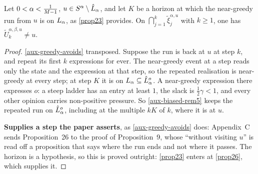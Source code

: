 \begin{lemma}
  \label{aux-near-greedy-avoids}
  \leanok
  Let $0 < \alpha < \tfrac{1}{M-1}$, $u \in S^\alpha \setminus \hat{L}_\alpha$, and
  let $K$ be a horizon at which the near-greedy run from $u$ is on
  $L_\alpha$, as \ref{prop23} provides.  On $\bigcap_{j=1}^{k}
  \tilde{\xi}_j^{\alpha,u}$ with $k \ge 1$, one has $\tilde{U}^{\alpha,\beta,u}_k
  \ne u$.
\end{lemma}
\begin{proof}
  \leanok
  \ref{aux-greedy-avoids} transposed.  Suppose the run is back at $u$ at step
  $k$, and repeat its first $k$ expressions for ever.  The near-greedy event at
  a step reads only the state and the expression at that step, so the repeated
  realisation is near-greedy at every step; at step $K$ it is on
  $L_\alpha \subseteq \hat{L}_\alpha^o$.  A near-greedy expression there
  expresses $o$: a steep ladder has an entry at least $1$, the slack is
  $\tfrac{1}{2}\gamma < 1$, and every other opinion carries non-positive
  pressure.  So \ref{aux-biased-rem5} keeps the repeated run on
  $\hat{L}_\alpha^o$, including at the multiple $kK$ of $k$, where it is at $u$.

  \textbf{Supplies a step the paper asserts}, as \ref{aux-greedy-avoids} does:
  Appendix~C sends Proposition~26 to the proof of Proposition~9, whose ``without
  visiting $u$'' is read off a proposition that says where the run ends and not
  where it passes.  The horizon is a hypothesis, so this is proved outright:
  \ref{prop23} enters at \ref{prop26}, which supplies it.
\end{proof}

